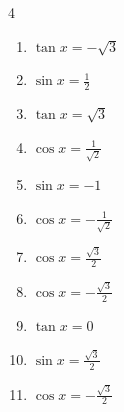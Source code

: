 \begin{multicols}{4}
\begin{enumerate}
  \item $\displaystyle \tan{x}  = -\sqrt{3}$


\columnbreak %

  \item $\displaystyle \sin{x}  = \frac{1}{2}$


  \item $\displaystyle \tan{x}  = \sqrt{3}$


  \item $\displaystyle \cos{x}  = \frac{1}{\sqrt{2}}$


  \item $\displaystyle \sin{x}  = -1$


  \item $\displaystyle \cos{x}  = -\frac{1}{\sqrt{2}}$


  \item $\displaystyle \cos{x}  = \frac{\sqrt{3}}{2}$


  \item $\displaystyle \cos{x}  = -\frac{\sqrt{3}}{2}$


  \item $\displaystyle \tan{x}  = 0$


  \item $\displaystyle \sin{x}  = \frac{\sqrt{3}}{2}$


  \item $\displaystyle \cos{x}  = -\frac{\sqrt{3}}{2}$



\end{enumerate}
\end{multicols}
